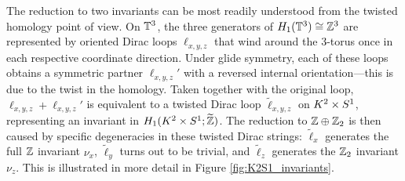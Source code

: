 The reduction to two invariants can be most readily understood from the twisted homology point of view. On $\mathbb{T}^3$, the three generators of $H_1(\mathbb{T}^3)\cong\mathbb{Z}^3$ are represented by oriented Dirac loops $\ell_{x,y,z}$ that wind around the 3-torus once in each respective coordinate direction. Under glide symmetry, each of these loops obtains a symmetric partner $\ell_{x,y,z}'$ with a reversed internal orientation---this is due to the twist in the homology. Taken together with the original loop, $\ell_{x,y,z} + \ell_{x,y,z}'$ is equivalent to a twisted Dirac loop $\tilde{\ell}_{x,y,z}$ on $K^2\times S^1$, representing an invariant in $H_1(K^2\times S^1;\widetilde{\mathbb{Z}})$. The reduction to $\mathbb{Z}\oplus\mathbb{Z}_2$ is then caused by specific degeneracies in these twisted Dirac strings: $\tilde{\ell}_x$ generates the full $\mathbb{Z}$ invariant $\nu_x$, $\tilde{\ell}_y$ turns out to be trivial, and $\tilde{\ell}_z$ generates the $\mathbb{Z}_2$ invariant $\nu_z$. This is illustrated in more detail in Figure \ref{fig:K2S1_invariants}.
